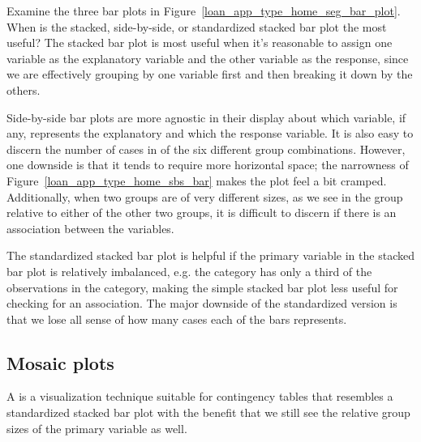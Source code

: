 \begin{examplewrap}
\begin{nexample}{Examine the three bar plots in
    Figure~\ref{loan_app_type_home_seg_bar_plot}.
    When is the stacked, side-by-side, or standardized
    stacked bar plot the most useful?}
  The stacked bar plot is most useful when it's reasonable
  to assign one variable as the explanatory variable and
  the other variable as the response, since we are effectively
  grouping by one variable first and then breaking it down by
  the others.

  Side-by-side bar plots are more agnostic in their display
  about which variable, if any, represents the explanatory
  and which the response variable.
  It is also easy to discern the number of cases
  in of the six different group combinations.
  However, one downside
  is that it tends to require more horizontal space;
  the narrowness of Figure~\ref{loan_app_type_home_sbs_bar}
  makes the plot feel a bit cramped.
  Additionally, when two groups are of very different sizes,
  as we see in the  group relative to either of the
  other two groups,
  it is difficult to discern if there is an association
  between the variables.

  The standardized stacked bar plot is helpful if the primary
  variable in the stacked bar plot is relatively imbalanced,
  e.g. the  category has only a third of the
  observations in the  category,
  making the simple stacked bar plot less useful for
  checking for an association.
  The major downside of the standardized version
  is that we lose all sense of how many cases each of the
  bars represents.
\end{nexample}
\end{examplewrap}


\subsection{Mosaic plots}
\label{mosaic_plots_subsection}

A  is a visualization technique
suitable for contingency tables that resembles
a standardized stacked bar plot with the benefit
that we still see the relative group sizes of the
primary variable as well.

